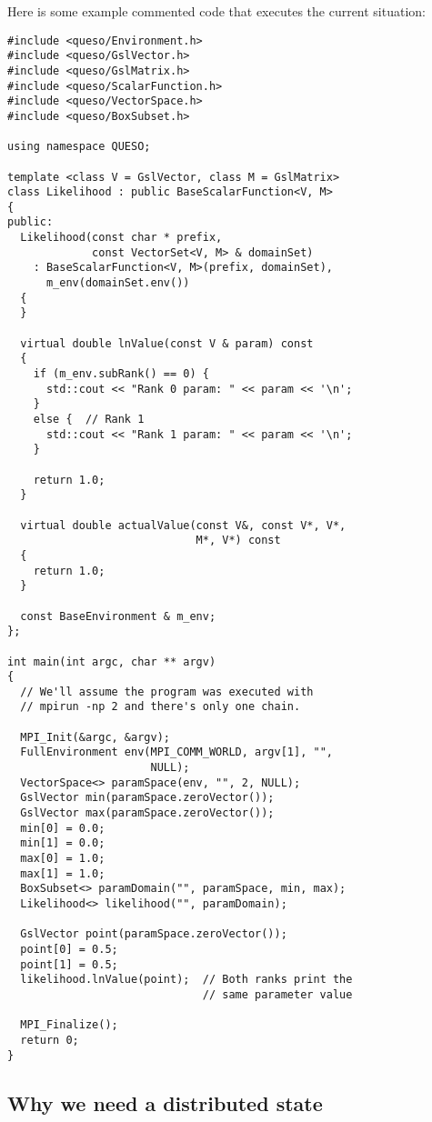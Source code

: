 \documentclass{article}
\begin{document}
Here is some example commented code that executes the current situation:
\begin{lstlisting}
#include <queso/Environment.h>
#include <queso/GslVector.h>
#include <queso/GslMatrix.h>
#include <queso/ScalarFunction.h>
#include <queso/VectorSpace.h>
#include <queso/BoxSubset.h>

using namespace QUESO;

template <class V = GslVector, class M = GslMatrix>
class Likelihood : public BaseScalarFunction<V, M>
{
public:
  Likelihood(const char * prefix,
             const VectorSet<V, M> & domainSet)
    : BaseScalarFunction<V, M>(prefix, domainSet),
      m_env(domainSet.env())
  {
  }

  virtual double lnValue(const V & param) const
  {
    if (m_env.subRank() == 0) {
      std::cout << "Rank 0 param: " << param << '\n';
    }
    else {  // Rank 1
      std::cout << "Rank 1 param: " << param << '\n';
    }

    return 1.0;
  }

  virtual double actualValue(const V&, const V*, V*,
                             M*, V*) const
  {
    return 1.0;
  }

  const BaseEnvironment & m_env;
};

int main(int argc, char ** argv)
{
  // We'll assume the program was executed with
  // mpirun -np 2 and there's only one chain.

  MPI_Init(&argc, &argv);
  FullEnvironment env(MPI_COMM_WORLD, argv[1], "",
                      NULL);
  VectorSpace<> paramSpace(env, "", 2, NULL);
  GslVector min(paramSpace.zeroVector());
  GslVector max(paramSpace.zeroVector());
  min[0] = 0.0;
  min[1] = 0.0;
  max[0] = 1.0;
  max[1] = 1.0;
  BoxSubset<> paramDomain("", paramSpace, min, max);
  Likelihood<> likelihood("", paramDomain);

  GslVector point(paramSpace.zeroVector());
  point[0] = 0.5;
  point[1] = 0.5;
  likelihood.lnValue(point);  // Both ranks print the
                              // same parameter value

  MPI_Finalize();
  return 0;
}
\end{lstlisting}

\subsection{Why we need a distributed state}
\end{document}
